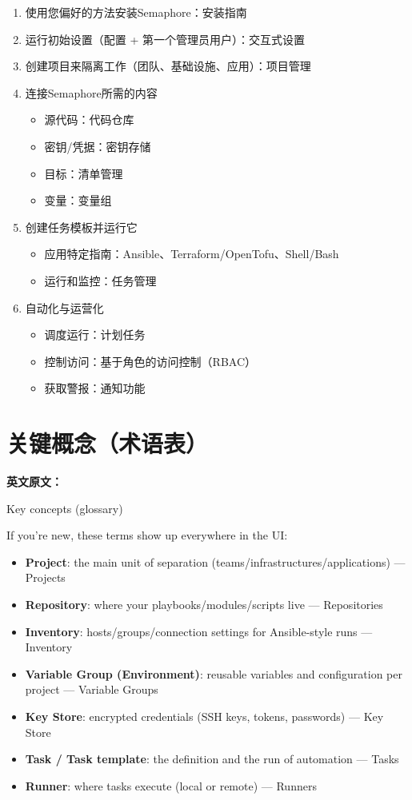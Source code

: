\documentclass[12pt,UTF8]{ctexbook}
\begin{document}
\begin{enumerate}[leftmargin=3.5em]
    \item 使用您偏好的方法安装Semaphore：安装指南
    \item 运行初始设置（配置 + 第一个管理员用户）：交互式设置
    \item 创建项目来隔离工作（团队、基础设施、应用）：项目管理
    \item 连接Semaphore所需的内容
    \begin{itemize}[leftmargin=2em]
        \item 源代码：代码仓库
        \item 密钥/凭据：密钥存储
        \item 目标：清单管理
        \item 变量：变量组
    \end{itemize}
    \item 创建任务模板并运行它
    \begin{itemize}[leftmargin=2em]
        \item 应用特定指南：Ansible、Terraform/OpenTofu、Shell/Bash
        \item 运行和监控：任务管理
    \end{itemize}
    \item 自动化与运营化
    \begin{itemize}[leftmargin=2em]
        \item 调度运行：计划任务
        \item 控制访问：基于角色的访问控制（RBAC）
        \item 获取警报：通知功能
    \end{itemize}
\end{enumerate}

\section{关键概念（术语表）}

\textbf{英文原文：}

Key concepts (glossary) 

If you're new, these terms show up everywhere in the UI: 

\begin{itemize}[leftmargin=3.5em]
    \item \textbf{Project}: the main unit of separation (teams/infrastructures/applications) — Projects 
    \item \textbf{Repository}: where your playbooks/modules/scripts live — Repositories 
    \item \textbf{Inventory}: hosts/groups/connection settings for Ansible-style runs — Inventory 
    \item \textbf{Variable Group (Environment)}: reusable variables and configuration per project — Variable Groups 
    \item \textbf{Key Store}: encrypted credentials (SSH keys, tokens, passwords) — Key Store 
    \item \textbf{Task / Task template}: the definition and the run of automation — Tasks 
    \item \textbf{Runner}: where tasks execute (local or remote) — Runners
\end{itemize}
\end{document}
